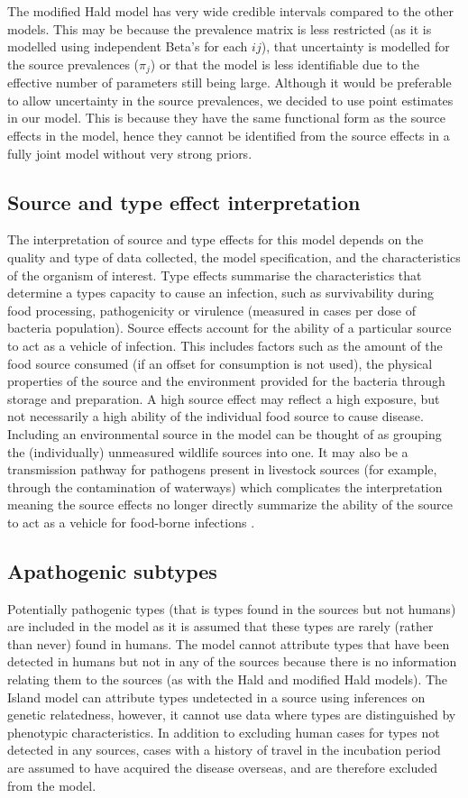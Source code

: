 The modified Hald model has very wide credible intervals compared to the other models. This may be because the prevalence matrix is less restricted (as it is modelled using independent Beta's for 
each $ij$), that uncertainty is modelled for the source prevalences ($\pi_{j}$) or that the model is less identifiable due to the effective number of parameters still being large. Although it would be 
preferable to allow uncertainty in the source prevalences, we decided to use point estimates in our model. This is because they have the same functional form as the source effects in the model, 
hence they cannot be identified from the source effects in a fully joint model without very strong priors.

\subsection{Source and type effect interpretation}
The interpretation of source and type effects for this model depends on the quality and type of data collected, the model specification, and the characteristics of the organism of interest. Type effects 
summarise the characteristics that determine a types capacity to cause an infection, such as survivability during food processing, pathogenicity or virulence (measured in cases per dose of bacteria 
population). Source effects account for the ability of a particular source to act as a vehicle of infection. This includes factors such as the amount of the food source consumed (if an offset for 
consumption is not used), the physical properties of the source and the environment provided for the bacteria through storage and preparation. A high source effect may reflect a high exposure, but 
not necessarily a high ability of the individual food source to cause disease. Including an environmental source in the model can be thought of as grouping the (individually) unmeasured wildlife 
sources into one. It may also be a transmission pathway for pathogens present in livestock sources (for example, through the contamination of waterways) which complicates the interpretation 
meaning the source effects no longer directly summarize the ability of the source to act as a vehicle for food-borne infections \citep{HaldVosWed04}.

\subsection{Apathogenic subtypes}
Potentially pathogenic types (that is types found in the sources but not humans) are included in the model as it is assumed that these types are rarely (rather than never) found in humans. The model 
cannot attribute types that have been detected in humans but not in any of the sources because there is no information relating them to the sources (as with the Hald and modified Hald models). The Island model \citep{WilGabLea08} can attribute types undetected in a source using inferences on genetic relatedness, 
however, it cannot use data where types are distinguished by phenotypic characteristics. In addition to excluding human cases for types not detected in any sources, cases with a history of travel in 
the incubation period are assumed to have acquired the disease overseas, and are therefore excluded from the model. 

